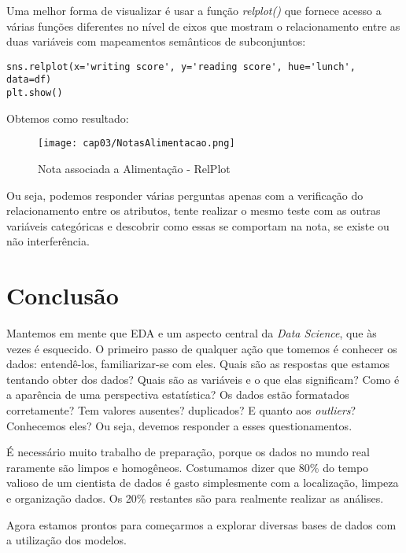 Uma melhor forma de visualizar é usar a função \textit{relplot()} que fornece acesso a várias funções diferentes no nível de eixos que mostram o relacionamento entre as duas variáveis com mapeamentos semânticos de subconjuntos:
\begin{lstlisting}
sns.relplot(x='writing score', y='reading score', hue='lunch', data=df)
plt.show()
\end{lstlisting}

Obtemos como resultado:
\begin{figure}[H]
	\centering
	\texttt{[image: cap03/NotasAlimentacao.png]}
	\caption{Nota associada a Alimentação - RelPlot}
\end{figure}

Ou seja, podemos responder várias perguntas apenas com a verificação do relacionamento entre os atributos, tente realizar o mesmo teste com as outras variáveis categóricas e descobrir como essas se comportam na nota, se existe ou não interferência. 

\section{Conclusão}
Mantemos em mente que EDA e um aspecto central da \textit{Data Science}, que às vezes é esquecido. O primeiro passo de qualquer ação que tomemos é conhecer os dados: entendê-los, familiarizar-se com eles. Quais são as respostas que estamos tentando obter dos dados? Quais são as variáveis e o que elas significam? Como é a aparência de uma perspectiva estatística? Os dados estão formatados corretamente? Tem valores ausentes? duplicados? E quanto aos \textit{outliers}? Conhecemos eles? Ou seja, devemos responder a esses questionamentos.

É necessário muito trabalho de preparação, porque os dados no mundo real raramente são limpos e homogêneos. Costumamos dizer que 80\% do tempo valioso de um cientista de dados é gasto simplesmente com a localização, limpeza e organização dados. Os 20\% restantes são para realmente realizar as análises.

Agora estamos prontos para começarmos a explorar diversas bases de dados com a utilização dos modelos.